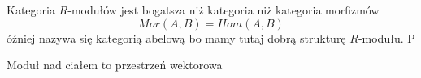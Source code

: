 Kategoria $R$-modułów jest bogatsza niż kategoria niż kategoria morfizmów
$$Mor(A, B)=Hom(A, B)$$óźniej nazywa się kategorią abelową
bo mamy tutaj dobrą strukturę $R$-modułu. P

Moduł nad ciałem to przestrzeń wektorowa


